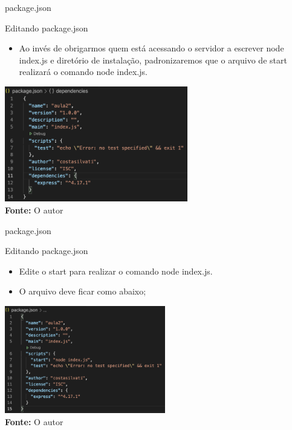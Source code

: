 \documentclass{beamer}
\begin{document}
\begin{frame}{package.json}
	\begin{exampleblock}{Editando package.json}
	\begin{itemize}
	\item Ao invés de obrigarmos quem está acessando o servidor a escrever node index.js e diretório de instalação, padronizaremos que o arquivo de start realizará o comando \alert{node index.js}.
	\end{itemize}
	\end{exampleblock}
	 \includegraphics[width=80mm]{resources/aula3_2.png}\\
    \tiny{\textbf{Fonte:} O autor}
\end{frame}
   
    \begin{frame}{package.json}
		\begin{exampleblock}{Editando package.json}
	\begin{itemize}
	\item Edite o start para realizar o comando \alert{node index.js}.
	\item O arquivo deve ficar como abaixo;
	\end{itemize}
	\end{exampleblock}
	\centering
	 \includegraphics[width=70mm]{resources/aula3_3.png}\\
    \tiny{\textbf{Fonte:} O autor}
\end{frame}
   
\end{document}
